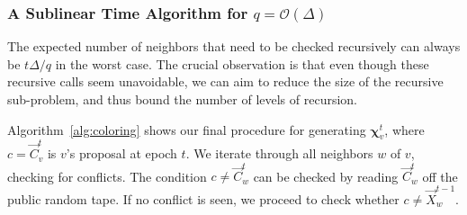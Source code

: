 \subsubsection{A Sublinear Time Algorithm for $q = \mathcal O(\Delta)$} 
\label{sec:jumping_back_to_past_epochs}
The expected number of neighbors that need to be checked recursively can always be $t\Delta/q$ in the worst case.
The crucial observation is that even though these recursive calls seem unavoidable,
we can aim to reduce the size of the recursive sub-problem, and thus bound the number of levels of recursion.

Algorithm~\ref{alg:coloring} shows our final procedure for generating $\bm\chi^t_v$, where $c =\vec C^t_v$ is $v$'s proposal at epoch $t$.
We iterate through all neighbors $w$ of $v$, checking for conflicts.
The condition $c\not=\vec C^t_w$ can be checked by reading $\vec C^t_w$ off the public random tape.
If no conflict is seen, we proceed to check whether $c\not= \vec X^{t-1}_w$.

